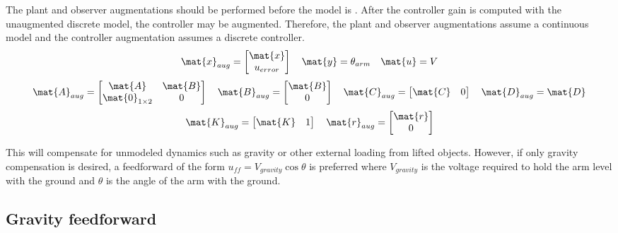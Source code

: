 The \gls{plant} and \gls{observer} augmentations should be performed before the
\gls{model} is . After the \gls{controller}
gain is computed with the unaugmented discrete \gls{model}, the controller may
be augmented. Therefore, the \gls{plant} and \gls{observer} augmentations assume
a continuous \gls{model} and the \gls{controller} augmentation assumes a
discrete \gls{controller}.
\begin{equation*}
  \mat{x}_{aug} =
  \begin{bmatrix}
    \mat{x} \\
    u_{error}
  \end{bmatrix}
  \quad
  \mat{y} = \theta_{arm}
  \quad
  \mat{u} = V
\end{equation*}
\begin{equation}
  \mat{A}_{aug} =
  \begin{bmatrix}
    \mat{A} & \mat{B} \\
    \mat{0}_{1 \times 2} & 0
  \end{bmatrix}
  \quad
  \mat{B}_{aug} =
  \begin{bmatrix}
    \mat{B} \\
    0
  \end{bmatrix}
  \quad
  \mat{C}_{aug} =
  \begin{bmatrix}
    \mat{C} & 0
  \end{bmatrix}
  \quad
  \mat{D}_{aug} = \mat{D}
\end{equation}
\begin{equation}
  \mat{K}_{aug} = \begin{bmatrix}
    \mat{K} & 1
  \end{bmatrix}
  \quad
  \mat{r}_{aug} = \begin{bmatrix}
    \mat{r} \\
    0
  \end{bmatrix}
\end{equation}

This will compensate for unmodeled dynamics such as gravity or other external
loading from lifted objects. However, if only gravity compensation is desired,
a feedforward of the form $u_{ff} = V_{gravity} \cos\theta$ is preferred where
$V_{gravity}$ is the voltage required to hold the arm level with the ground and
$\theta$ is the angle of the arm with the ground.

\subsection{Gravity feedforward}

